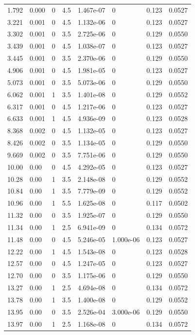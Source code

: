 \documentclass[preview]{standalone}
\begin{document}
{{\begin{tabular}{L{1.2cm}C{1.2cm} C{0.3cm}C{0.5cm} C{1.4cm}C{1.4cm} C{1.4cm}C{1.4cm}}
  1.792  &  0.000  & 0     & 4.5 &  1.467e-07  & 0  & 0.123 &  0.0527   \\ 
  3.221  &  0.001  & 0     & 4.5 &  1.132e-06  & 0  & 0.123 &  0.0527   \\ 
  3.302  &  0.001  & 0     & 3.5 &  2.725e-06  & 0  & 0.129 &  0.0550   \\ 
  3.439  &  0.001  & 0     & 4.5 &  1.038e-07  & 0  & 0.123 &  0.0527   \\ 
  3.445  &  0.001  & 0     & 3.5 &  2.370e-06  & 0  & 0.129 &  0.0550   \\ 
  4.906  &  0.001  & 0     & 4.5 &  1.981e-05  & 0  & 0.123 &  0.0527   \\ 
  5.073  &  0.001  & 0     & 3.5 &  5.073e-06  & 0  & 0.129 &  0.0550   \\ 
  6.062  &  0.001  & 1     & 3.5 &  1.401e-08  & 0  & 0.129 &  0.0552   \\ 
  6.317  &  0.001  & 0     & 4.5 &  1.217e-06  & 0  & 0.123 &  0.0527   \\ 
  6.633  &  0.001  & 1     & 4.5 &  4.936e-09  & 0  & 0.123 &  0.0528   \\ 
  8.368  &  0.002  & 0     & 4.5 &  1.132e-05  & 0  & 0.123 &  0.0527   \\ 
  8.426  &  0.002  & 0     & 3.5 &  1.134e-05  & 0  & 0.129 &  0.0550   \\ 
  9.669  &  0.002  & 0     & 3.5 &  7.751e-06  & 0  & 0.129 &  0.0550   \\ 
  10.00  &  0.00  & 0     & 4.5 &  4.292e-05  & 0  & 0.123 &  0.0527   \\ 
  10.28  &  0.00  & 1     & 3.5 &  2.148e-08  & 0  & 0.129 &  0.0552   \\ 
  10.84  &  0.00  & 1     & 3.5 &  7.779e-09  & 0  & 0.129 &  0.0552   \\ 
  10.96  &  0.00  & 1     & 5.5 &  1.625e-08  & 0  & 0.117 &  0.0502   \\ 
  11.32  &  0.00  & 0     & 3.5 &  1.925e-07  & 0  & 0.129 &  0.0550   \\ 
  11.34  &  0.00  & 1     & 2.5 &  6.941e-09  & 0  & 0.134 &  0.0572   \\ 
  11.48  &  0.00  & 0     & 4.5 &  5.246e-05  & 1.000e-06  & 0.123 &  0.0527   \\ 
  12.22  &  0.00  & 1     & 4.5 &  1.543e-08  & 0  & 0.123 &  0.0528   \\ 
  12.57  &  0.00  & 0     & 4.5 &  1.247e-05  & 0  & 0.123 &  0.0527   \\ 
  12.70  &  0.00  & 0     & 3.5 &  1.175e-06  & 0  & 0.129 &  0.0550   \\ 
  13.27  &  0.00  & 1     & 2.5 &  4.694e-08  & 0  & 0.134 &  0.0572   \\ 
  13.78  &  0.00  & 1     & 3.5 &  1.400e-08  & 0  & 0.129 &  0.0552   \\ 
  13.95  &  0.00  & 0     & 3.5 &  2.526e-04  & 3.000e-06  & 0.129 &  0.0550   \\ 
  13.97  &  0.00  & 1     & 2.5 &  1.168e-08  & 0  & 0.134 &  0.0572   \\ 
\hline 
\end{tabular} 

}}
\end{document}
